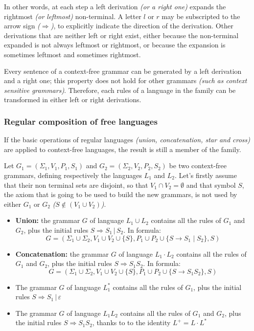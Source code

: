 \documentclass[english]{article}
\begin{document}
\bigskip
In other words, at each step a left derivation \textit{(or a right one)} expands the rightmost \textit{(or leftmost)} non-terminal.
A letter \(l\) or \(r\) may be subscripted to the arrow sign \textit{(\(\Rightarrow\))}, to explicitly indicate the direction of the derivation.
Other derivations that are neither left or right exist, either because the non-terminal expanded is not always leftmost or rightmost, or because the expansion is sometimes leftmost and sometimes rightmost.

Every sentence of a context-free grammar can be generated by a left derivation and a right one;
this property does not hold for other grammars \textit{(such as context sensitive grammars)}.
Therefore, each rules of a language in the \CF family can be transformed in either left or right derivations.

\subsubsection{Regular composition of free languages}

If the basic operations of regular languages \textit{(union, concatenation, star and cross)} are applied to context-free languages, the result is still a member of the \CF family.

Let \(G_1 = \left(\Sigma_1, V_1, P_1, S_1 \right)\) and \(G_2 = \left(\Sigma_2, V_2, P_2, S_2 \right)\) be two context-free grammars, defining respectively the languages \(L_1\) and \(L_2\).
Let's firstly assume that their non terminal sets are disjoint, so that \(V_1 \cap V_2 = \emptyset\) and that symbol \(S\), the axiom that is going to be used to build the new grammars, is not used by either \(G_1\) or \(G_2\) \textit{(\(S \notin (V_1 \cup V_2)\))}.

\begin{itemize}
  \item \textbf{Union:} the grammar \(G\) of language \(L_1 \cup L_2\) contains all the rules of \(G_1\) and \(G_2\), plus the initial rules \(S \Rightarrow S_1 \,|\, S_2 \). In formula:
        \[ G = \left(\Sigma_1 \cup \Sigma_2, V_1 \cup V_2 \cup \{S\}, P_1 \cup P_2 \cup \{S \rightarrow S_1 \mid S_2\}, S \right) \]
  \item \textbf{Concatenation:} the grammar \(G\) of language \(L_1 \cdot L_2\) contains all the rules of \(G_1\) and \(G_2\), plus the initial rules \(S \Rightarrow S_1 S_2\). In formula:
        \[ G = \left(\Sigma_1 \cup \Sigma_2, V_1 \cup V_2 \cup \{S\}, P_1 \cup P_2 \cup \{S \rightarrow S_1 S_2\}, S \right) \]
  \item The grammar \(G\) of language \(L_1^\ast\) contains all the rules of \(G_1\), plus the initial rules \(S \Rightarrow S_1 \,|\, \varepsilon\)
  \item The grammar \(G\) of language \(L_1  L_2\) contains all the rules of \(G_1\) and \(G_2\), plus the initial rules \(S \Rightarrow S_1 S_2\), thanks to to the identity \(L^+ = L \cdot L^\ast\)
\end{itemize}
\end{document}

